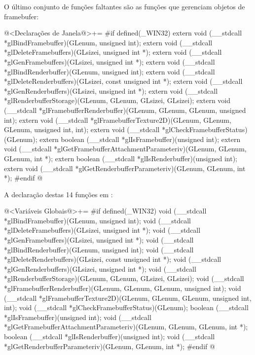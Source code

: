O último conjunto de funções faltantes são as funções que gerenciam
objetos de framebufer:

\iniciocodigo
@<Declarações de Janela@>+=
#if defined(_WIN32)
extern void (__stdcall *glBindFramebuffer)(GLenum, unsigned int);
extern void (__stdcall *glDeleteFramebuffers)(GLsizei, unsigned int *);
extern void (__stdcall *glGenFramebuffers)(GLsizei, unsigned int *);
extern void (__stdcall *glBindRenderbuffer)(GLenum, unsigned int);
extern void (__stdcall *glDeleteRenderbuffers)(GLsizei, const unsigned int *);
extern void (__stdcall *glGenRenderbuffers)(GLsizei, unsigned int *);
extern void (__stdcall *glRenderbufferStorage)(GLenum, GLenum, GLsizei, GLsizei);
extern void (__stdcall *glFramebufferRenderbuffer)(GLenum, GLenum, GLenum,
                                                   unsigned int);
extern void (__stdcall *glFramebufferTexture2D)(GLenum, GLenum, GLenum,
                                                unsigned int, int);
extern void (__stdcall *glCheckFramebufferStatus)(GLenum);
extern boolean (__stdcall *glIsFramebuffer)(unsigned int);
extern void (__stdcall *glGetFramebufferAttachmentParameteriv)(GLenum, GLenum,
                                                               GLenum, int *);
extern boolean (__stdcall *glIsRenderbuffer)(unsigned int);
extern void (__stdcall *glGetRenderbufferParameteriv)(GLenum, GLenum, int *);
#endif
@
\fimcodigo

A declaração destas 14 funções em :

\iniciocodigo
@<Variáveis Globais@>+=
#if defined(_WIN32)
void (__stdcall *glBindFramebuffer)(GLenum, unsigned int);
void (__stdcall *glDeleteFramebuffers)(GLsizei, unsigned int *);
void (__stdcall *glGenFramebuffers)(GLsizei, unsigned int *);
void (__stdcall *glBindRenderbuffer)(GLenum, unsigned int);
void (__stdcall *glDeleteRenderbuffers)(GLsizei, const unsigned int *);
void (__stdcall *glGenRenderbuffers)(GLsizei, unsigned int *);
void (__stdcall *glRenderbufferStorage)(GLenum, GLenum, GLsizei, GLsizei);
void (__stdcall *glFramebufferRenderbuffer)(GLenum, GLenum, GLenum,
                                            unsigned int);
void (__stdcall *glFramebufferTexture2D)(GLenum, GLenum, GLenum,
                                         unsigned int, int);
void (__stdcall *glCheckFramebufferStatus)(GLenum);
boolean (__stdcall *glIsFramebuffer)(unsigned int);
void (__stdcall *glGetFramebufferAttachmentParameteriv)(GLenum, GLenum,
                                                        GLenum, int *);
boolean (__stdcall *glIsRenderbuffer)(unsigned int);
void (__stdcall *glGetRenderbufferParameteriv)(GLenum, GLenum, int *);
#endif
@
\fimcodigo

